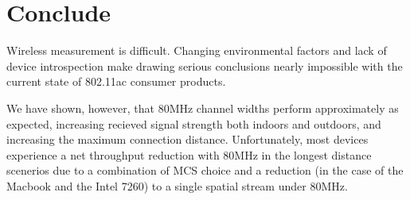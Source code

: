 \section{Conclude}
Wireless measurement is difficult. Changing environmental factors and
lack of device introspection make drawing serious conclusions nearly
impossible with the current state of 802.11ac consumer products.

We have shown, however, that 80MHz channel widths perform
approximately as expected, increasing recieved signal strength both
indoors and outdoors, and increasing the maximum connection distance.
Unfortunately, most devices experience a net throughput reduction with
80MHz in the longest distance scenerios due to a combination of MCS
choice and a reduction (in the case of the Macbook and the Intel 7260)
to a single spatial stream under 80MHz.

